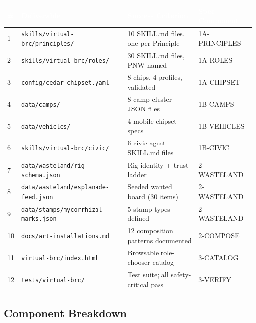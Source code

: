\documentclass[11pt,letterpaper]{article}
\newcommand{\tableheader}[1]{\textbf{\sffamily\textcolor{white}{#1}}}
\begin{document}
\begin{center}
\begin{tabularx}{\textwidth}{C{0.5cm}L{4cm}L{3cm}X}
\toprule
{}
\tableheader{\#} & \tableheader{Deliverable} & \tableheader{Success Criterion} & \tableheader{Spec Component} \\
 & \texttt{skills/virtual-brc/principles/} & 10 SKILL.md files, one per Principle & 1A-PRINCIPLES \\
2 & \texttt{skills/virtual-brc/roles/} & 30 SKILL.md files, PNW-named & 1A-ROLES \\
3 & \texttt{config/cedar-chipset.yaml} & 8 chips, 4 profiles, validated & 1A-CHIPSET \\
4 & \texttt{data/camps/} & 8 camp cluster JSON files & 1B-CAMPS \\
5 & \texttt{data/vehicles/} & 4 mobile chipset specs & 1B-VEHICLES \\
6 & \texttt{skills/virtual-brc/civic/} & 6 civic agent SKILL.md files & 1B-CIVIC \\
7 & \texttt{data/wasteland/rig-schema.json} & Rig identity + trust ladder & 2-WASTELAND \\
8 & \texttt{data/wasteland/esplanade-feed.json} & Seeded wanted board (30 items) & 2-WASTELAND \\
9 & \texttt{data/stamps/mycorrhizal-marks.json} & 5 stamp types defined & 2-WASTELAND \\
10 & \texttt{docs/art-installations.md} & 12 composition patterns documented & 2-COMPOSE \\
11 & \texttt{virtual-brc/index.html} & Browsable role-chooser catalog & 3-CATALOG \\
12 & \texttt{tests/virtual-brc/} & Test suite; all safety-critical pass & 3-VERIFY \\
\bottomrule
\end{tabularx}
\end{center}

\subsection{Component Breakdown}
\end{document}
